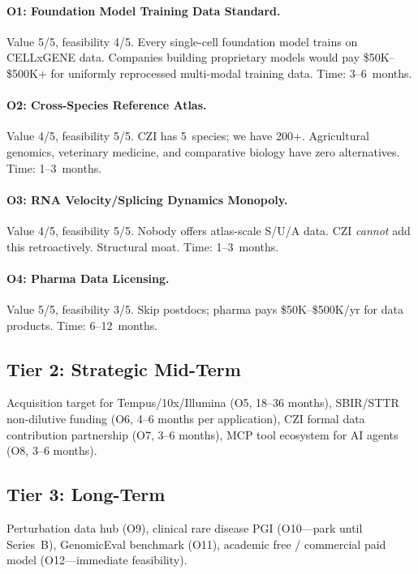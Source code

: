 \documentclass[10pt,twocolumn,letterpaper]{article}
\begin{document}
\paragraph{O1: Foundation Model Training Data Standard.}
Value 5/5, feasibility 4/5. Every single-cell foundation model trains on
CELLxGENE data. Companies building proprietary models would pay \$50K--\$500K+
for uniformly reprocessed multi-modal training data. Time: 3--6~months.

\paragraph{O2: Cross-Species Reference Atlas.}
Value 4/5, feasibility 5/5. CZI has 5~species; we have 200+. Agricultural
genomics, veterinary medicine, and comparative biology have zero alternatives.
Time: 1--3~months.

\paragraph{O3: RNA Velocity/Splicing Dynamics Monopoly.}
Value 4/5, feasibility 5/5. Nobody offers atlas-scale S/U/A data.
CZI \emph{cannot} add this retroactively. Structural moat. Time: 1--3~months.

\paragraph{O4: Pharma Data Licensing.}
Value 5/5, feasibility 3/5. Skip postdocs; pharma pays \$50K--\$500K/yr for
data products. Time: 6--12~months.

\subsection{Tier 2: Strategic Mid-Term}

Acquisition target for Tempus/10x/Illumina (O5, 18--36 months),
SBIR/STTR non-dilutive funding (O6, 4--6 months per application),
CZI formal data contribution partnership (O7, 3--6 months),
MCP tool ecosystem for AI agents (O8, 3--6 months).

\subsection{Tier 3: Long-Term}

Perturbation data hub (O9), clinical rare disease PGI (O10---park until
Series~B), GenomicEval benchmark (O11), academic free / commercial paid model
(O12---immediate feasibility).
\end{document}
